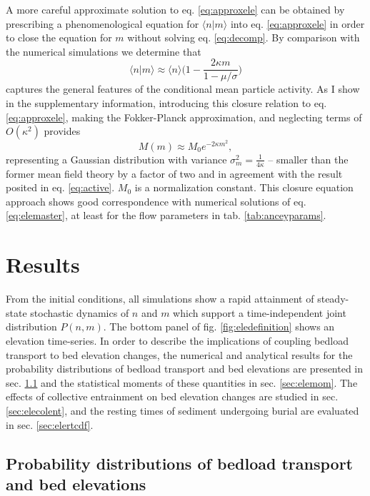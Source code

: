 A more careful approximate solution to eq. \ref{eq:approxele} can be obtained by prescribing a phenomenological equation for $\langle n | m \rangle$ into eq. \ref{eq:approxele} in order to close the equation for $m$ without solving eq. \ref{eq:decomp}.
By comparison with the numerical simulations we determine that
\begin{equation}
	\langle n | m  \rangle \approx \langle n \rangle \Big( 1 - \frac{2\kappa m}{1-\mu/\sigma}\Big) \label{eq:closure}
\end{equation}
captures the general features of the conditional mean particle activity.
As I show in the supplementary information, introducing this closure relation to eq. \ref{eq:approxele}, making the Fokker-Planck approximation, and neglecting terms of $O(\kappa^2)$ provides 
\begin{equation} M(m) \approx M_0 e^{-2\kappa m^2}, \label{eq:ou2}\end{equation}
representing a Gaussian distribution with variance $\sigma_m^2 = \frac{1}{4\kappa}$ -- smaller than the former mean field theory by a factor of two and in agreement with the result posited in eq. \ref{eq:active}.
$M_0$ is a normalization constant. 
This closure equation approach shows good correspondence with numerical solutions of eq. \ref{eq:elemaster}, at least for the flow parameters in tab. \ref{tab:anceyparams}.

\section{Results}
\label{sec:eleresults}

From the initial conditions, all simulations show a rapid attainment of steady-state stochastic dynamics of $n$ and $m$ which support a time-independent joint distribution $P(n,m)$. The bottom panel of fig. \ref{fig:eledefinition} shows an elevation time-series. In order to describe the implications of coupling bedload transport to bed elevation changes, the numerical and analytical results for the probability distributions of bedload transport and bed elevations are presented in sec. \ref{sec:elepdf} and the statistical moments of these quantities in sec. \ref{sec:elemom}. The effects of collective entrainment on bed elevation changes are studied in sec. \ref{sec:elecolent}, and the resting times of sediment undergoing burial are evaluated in sec. \ref{sec:elertcdf}.

\subsection{Probability distributions of bedload transport and bed elevations}
\label{sec:elepdf}

